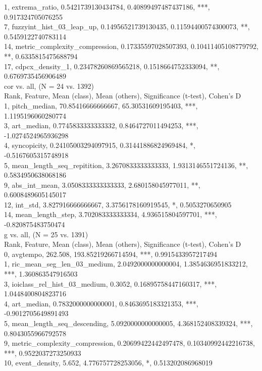 1, extrema_ratio, 0.5421739130434784, 0.40899497487437186, ***, 0.917324705076255\\
7, fuzzyint_hist_03_leap_up, 0.14956521739130435, 0.11594400574300073, **, 0.5459122740783114\\
14, metric_complexity_compression, 0.17335597028507393, 0.10411405108779792, **, 0.6335815475688794\\
17, cdpcx_density_1, 0.23478260869565218, 0.1518664752333094, **, 0.6769735456906489\\
cor vs. all, (N = 24 vs. 1392)\\
Rank, Feature, Mean (class), Mean (others), Significance (t-test), Cohen's D\\
1, pitch_median, 70.85416666666667, 65.30531609195403, ***, 1.1195196060280774\\
3, art_median, 0.7745833333333332, 0.8464727011494253, ***, -1.0274524965936298\\
4, syncopicity, 0.24105003294097915, 0.31441886824969484, *, -0.5167605315748918\\
5, mean_length_seq_repitition, 3.2670833333333333, 1.9313146551724136, **, 0.5834950638068186\\
9, abs_int_mean, 3.0508333333333333, 2.680158045977011, **, 0.6008489605145017\\
12, int_std, 3.827916666666667, 3.3756178160919545, *, 0.5053270650905\\
14, mean_length_step, 3.702083333333334, 4.936515804597701, ***, -0.820875483750474\\
g vs. all, (N = 25 vs. 1391)\\
Rank, Feature, Mean (class), Mean (others), Significance (t-test), Cohen's D\\
0, avgtempo, 262.508, 193.85219266714594, ***, 0.9915433957217494\\
1, ric_mean_seg_len_03_medium, 2.0492000000000004, 1.3854636951833212, ***, 1.360863547916503\\
3, ioiclass_rel_hist_03_medium, 0.3052, 0.16895758447160317, ***, 1.0448400804823716\\
4, art_median, 0.7832000000000001, 0.8463695183321353, ***, -0.9012705649891493\\
5, mean_length_seq_descending, 5.0920000000000005, 4.368152408339324, ***, 0.8043055966792578\\
9, metric_complexity_compression, 0.20699422442497478, 0.10340992442216738, ***, 0.9522037273250933\\
10, event_density, 5.652, 4.776757728253056, *, 0.513202086968019\\
